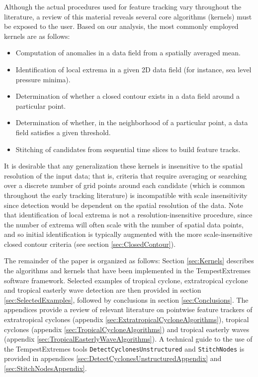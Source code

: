 \documentclass[gmdd, hvmath, online]{copernicus_discussions}
\begin{document}
Although the actual procedures used for feature tracking vary throughout the literature, a review of this material reveals several core algorithms (kernels) must be exposed to the user.  Based on our analysis, the most commonly employed kernels are as follows:
\begin{itemize}
\item Computation of anomalies in a data field from a spatially averaged mean.
\item Identification of local extrema in a given 2D data field (for instance, sea level pressure minima).
\item Determination of whether a closed contour exists in a data field around a particular point.
\item Determination of whether, in the neighborhood of a particular point, a data field satisfies a given threshold.
\item Stitching of candidates from sequential time slices to build feature tracks.
\end{itemize}  It is desirable that any generalization these kernels is insensitive to the spatial resolution of the input data; that is, criteria that require averaging or searching over a discrete number of grid points around each candidate (which is common throughout the early tracking literature) is incompatible with scale insensitivity since detection would be dependent on the spatial resolution of the data. Note that identification of local extrema is not a resolution-insensitive procedure, since the number of extrema will often scale with the number of spatial data points, and so initial identification is typically augmented with the more scale-insensitive closed contour criteria (see section \ref{sec:ClosedContour}).

The remainder of the paper is organized as follows:  Section \ref{sec:Kernels} describes the algorithms and kernels that have been implemented in the TempestExtremes software framework.  Selected examples of tropical cyclone, extratropical cyclone and tropical easterly wave detection are then provided in section \ref{sec:SelectedExamples}, followed by conclusions in section \ref{sec:Conclusions}.  The appendices provide a review of relevant literature on pointwise feature trackers of extratropical cyclones (appendix \ref{sec:ExtratropicalCycloneAlgorithms}), tropical cyclones (appendix \ref{sec:TropicalCycloneAlgorithms}) and tropical easterly waves (appendix \ref{sec:TropicalEasterlyWaveAlgorithms}).  A technical guide to the use of the TempestExtremes tools \texttt{DetectCyclonesUnstructured} and \texttt{StitchNodes} is provided in appendices \ref{sec:DetectCyclonesUnstructuredAppendix} and \ref{sec:StitchNodesAppendix}.
\end{document}
